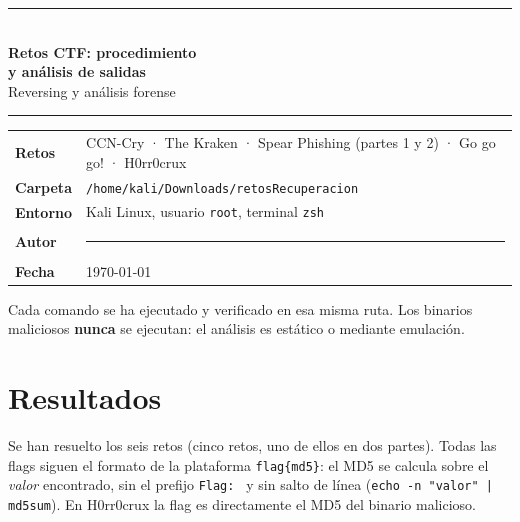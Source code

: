 \documentclass[11pt,a4paper]{article}
\newcommand{\autor}{\rule{6cm}{0.4pt}}  %
\begin{document}
\begin{titlepage}
\centering
\vspace*{2cm}
{\color{titulo}\rule{\linewidth}{1.2pt}\\[0.6cm]
{\Huge\bfseries Retos CTF: procedimiento\\[0.25cm] y análisis de salidas}\\[0.4cm]
{\Large Reversing y análisis forense}\\[0.4cm]
\rule{\linewidth}{1.2pt}}
\vspace{1.5cm}

\begin{tcolorbox}[enhanced, colback=gray!4, colframe=titulo, boxrule=0.6pt, arc=3pt, width=0.88\linewidth]
\begin{tabularx}{\linewidth}{@{}lX@{}}
\textbf{Retos} & CCN-Cry · The Kraken · Spear Phishing (partes 1 y 2) · Go go go! · H0rr0crux \\[2pt]
\textbf{Carpeta} & \texttt{/home/kali/Downloads/retosRecuperacion} \\[2pt]
\textbf{Entorno} & Kali Linux, usuario \texttt{root}, terminal \texttt{zsh} \\[2pt]
\textbf{Autor} & \autor \\[2pt]
\textbf{Fecha} & \today \\
\end{tabularx}
\end{tcolorbox}

\vfill
{\small Cada comando se ha ejecutado y verificado en esa misma ruta. Los binarios maliciosos \textbf{nunca} se
ejecutan: el análisis es estático o mediante emulación.}
\end{titlepage}

\section*{Resultados}


Se han resuelto los seis retos (cinco retos, uno de ellos en dos partes). Todas las flags siguen el
formato de la plataforma \texttt{flag\{md5\}}: el MD5 se calcula sobre el \emph{valor} encontrado, sin el prefijo
\texttt{Flag:~} y sin salto de línea (\texttt{echo -n "valor" | md5sum}). En H0rr0crux la flag es directamente el
MD5 del binario malicioso.
\end{document}
